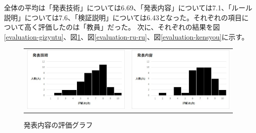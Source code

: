 全体の平均は「発表技術」については6.69、「発表内容」については7.1、「ルール説明」については7.6、「検証説明」については6.43となった。それぞれの項目について高く評価したのは「教員」だった。
次に、それぞれの結果を図\ref{evaluation-gizyutu}、図\ref{evaluation-naiyou}、図\ref{evaluation-ru-ru}、図\ref{evaluation-kensyou}に示す。

\begin{figure}[h]
 \begin{tabular}{cc}
  \begin{minipage}[h]{0.45\hsize}
  \centering
 \includegraphics[width=0.7\linewidth]{./figure/evaluation-gizyutu.jpg}
\caption{発表技術の評価グラフ}
\label{evaluation-gizyutu}
 \end{minipage} &

\begin{minipage}[h]{0.45\hsize}
  \centering
 \includegraphics[width=0.7\linewidth]{./figure/evaluation-naiyou.jpg}
 \caption{発表内容の評価グラフ}
\label{evaluation-naiyou}
\end{minipage} 
\end{tabular}
\end{figure}

